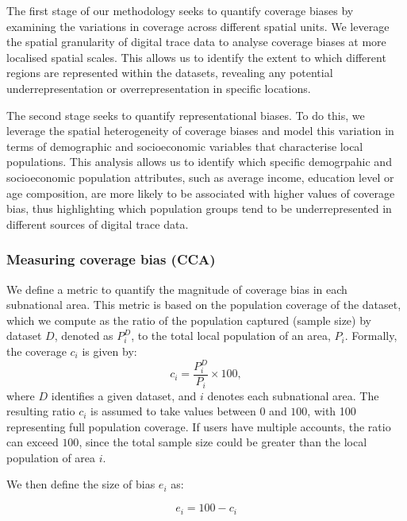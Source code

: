\documentclass[]{rsos}%
\begin{document}
The first stage of our methodology seeks to quantify coverage biases by
examining the variations in coverage across different spatial units. We
leverage the spatial granularity of digital trace data to analyse
coverage biases at more localised spatial scales. This allows us to
identify the extent to which different regions are represented within
the datasets, revealing any potential underrepresentation or
overrepresentation in specific locations.

The second stage seeks to quantify representational biases. To do this,
we leverage the spatial heterogeneity of coverage biases and model this
variation in terms of demographic and socioeconomic variables that
characterise local populations. This analysis allows us to identify
which specific demogrpahic and socioeconomic population attributes, such
as average income, education level or age composition, are more likely
to be associated with higher values of coverage bias, thus highlighting
which population groups tend to be underrepresented in different sources
of digital trace data.

\hypertarget{measuring-coverage-bias-cca}{%
\subsubsection{Measuring coverage bias (CCA)}\label{measuring-coverage-bias-cca}}

We define a metric to quantify the magnitude of coverage bias in each
subnational area. This metric is based on the population coverage of the
dataset, which we compute as the ratio of the population captured
(sample size) by dataset \(D\), denoted as \(P_i^D\), to the total local
population of an area, \(P_i\). Formally, the coverage \(c_i\) is given by:
\begin{equation}
c_i = \dfrac{P_i^D}{P_i} \times 100,
\end{equation} where \(D\) identifies a given dataset, and \(i\) denotes
each subnational area. The resulting ratio \(c_i\) is assumed to take
values between \(0\) and \(100\), with 100 representing full population
coverage. If users have multiple accounts, the ratio can exceed \(100\),
since the total sample size could be greater than the local population
of area \(i\).

We then define the size of bias \(e_i\) as:

\begin{equation} \label{eq:size-bias}
e_i = 100 - c_i
\end{equation}
\end{document}
